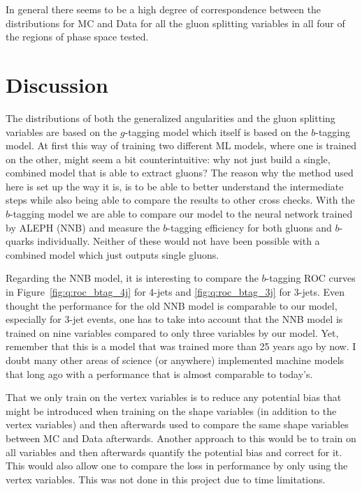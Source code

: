 In general there seems to be a high degree of correspondence between the distributions for MC and Data for all the gluon splitting variables in all four of the regions of phase space tested. 



\section{Discussion}
\label{sec:q:discussion}

The distributions of both the generalized angularities and the gluon splitting variables are based on the $g$-tagging model which itself is based on the $b$-tagging model. At first this way of training two different ML models, where one is trained on the other, might seem a bit counterintuitive: why not just build a single, combined model that is able to extract gluons? The reason why the method used here is set up the way it is, is to be able to better understand the intermediate steps while also being able to compare the results to other cross checks. With the $b$-tagging model we are able to compare our model to the neural network trained by ALEPH (NNB) and measure the $b$-tagging efficiency for both gluons and $b$-quarks individually. Neither of these would not have been possible with a combined model which just outputs single gluons. 

Regarding the NNB model, it is interesting to compare the $b$-tagging ROC curves in Figure~\ref{fig:q:roc_btag_4j} for 4-jets and \ref{fig:q:roc_btag_3j} for 3-jets. Even thought the performance for the old NNB model is comparable to our model, especially for 3-jet events, one has to take into account that the NNB model is trained on nine variables compared to only three variables by our model. Yet, remember that this is a model that was trained more than \num{25} years ago by now. I doubt many other areas of science (or anywhere) implemented machine models that long ago with a performance that is almost comparable to today's.

That we only train on the vertex variables is to reduce any potential bias that might be introduced when training on the shape variables (in addition to the vertex variables) and then afterwards used to compare the same shape variables between MC and Data afterwards. Another approach to this would be to train on all variables and then afterwards quantify the potential bias and correct for it. This would also allow one to compare the loss in performance by only using the vertex variables. This was not done in this project due to time limitations.

